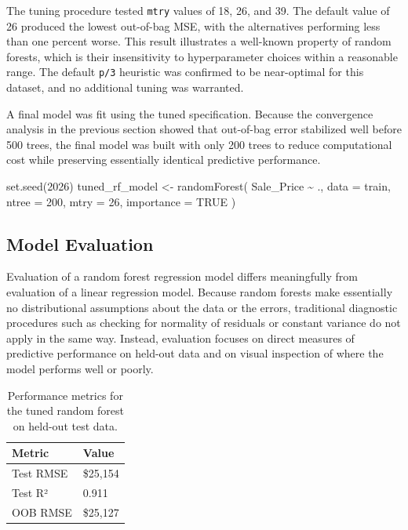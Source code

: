 \documentclass[
  11pt,
  letterpaper,
]{article}
\newenvironment{Shaded}{\begin{snugshade}}{\end{snugshade}}
\newcommand{\AttributeTok}[1]{\textcolor[rgb]{0.40,0.45,0.13}{#1}}
\newcommand{\ConstantTok}[1]{\textcolor[rgb]{0.56,0.35,0.01}{#1}}
\newcommand{\DecValTok}[1]{\textcolor[rgb]{0.68,0.00,0.00}{#1}}
\newcommand{\FunctionTok}[1]{\textcolor[rgb]{0.28,0.35,0.67}{#1}}
\newcommand{\NormalTok}[1]{\textcolor[rgb]{0.00,0.23,0.31}{#1}}
\newcommand{\OtherTok}[1]{\textcolor[rgb]{0.00,0.23,0.31}{#1}}
\newcommand{\SpecialCharTok}[1]{\textcolor[rgb]{0.37,0.37,0.37}{#1}}
\begin{document}
The tuning procedure tested \texttt{mtry} values of 18, 26, and 39. The
default value of 26 produced the lowest out-of-bag MSE, with the
alternatives performing less than one percent worse. This result
illustrates a well-known property of random forests, which is their
insensitivity to hyperparameter choices within a reasonable range. The
default \texttt{p/3} heuristic was confirmed to be near-optimal for this
dataset, and no additional tuning was warranted.

A final model was fit using the tuned specification. Because the
convergence analysis in the previous section showed that out-of-bag
error stabilized well before 500 trees, the final model was built with
only 200 trees to reduce computational cost while preserving essentially
identical predictive performance.

\begin{Shaded}
\begin{Highlighting}[]
\FunctionTok{set.seed}\NormalTok{(}\DecValTok{2026}\NormalTok{)}
\NormalTok{tuned\_rf\_model }\OtherTok{\textless{}{-}} \FunctionTok{randomForest}\NormalTok{(}
\NormalTok{  Sale\_Price }\SpecialCharTok{\textasciitilde{}}\NormalTok{ .,}
  \AttributeTok{data =}\NormalTok{ train,}
  \AttributeTok{ntree =} \DecValTok{200}\NormalTok{,}
  \AttributeTok{mtry =} \DecValTok{26}\NormalTok{,}
  \AttributeTok{importance =} \ConstantTok{TRUE}
\NormalTok{)}
\end{Highlighting}
\end{Shaded}

\subsection{Model Evaluation}\label{model-evaluation}

Evaluation of a random forest regression model differs meaningfully from
evaluation of a linear regression model. Because random forests make
essentially no distributional assumptions about the data or the errors,
traditional diagnostic procedures such as checking for normality of
residuals or constant variance do not apply in the same way. Instead,
evaluation focuses on direct measures of predictive performance on
held-out data and on visual inspection of where the model performs well
or poorly.

\begin{longtable}[t]{ll}
\caption{\label{tab:rf-evaluation-table}Performance metrics for the tuned random forest on held-out test data.}\\
\toprule
Metric & Value\\
\midrule
Test RMSE & \$25,154\\
Test R² & 0.911\\
OOB RMSE & \$25,127\\
\bottomrule
\end{longtable}
\end{document}

